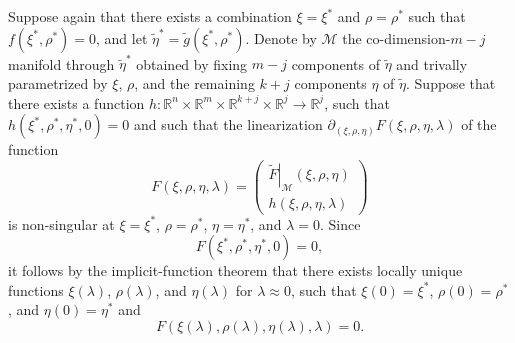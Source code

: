 \documentclass{article}
\begin{document}
Suppose again that there exists a combination $\xi =\xi ^{\ast }$ and $\rho
=\rho ^{\ast }$ such that $f\left( \xi ^{\ast },\rho ^{\ast }\right) =0$,
and let $\tilde{\eta}^{\ast }=\tilde{g}\left( \xi ^{\ast },\rho ^{\ast
}\right) $. Denote by $\mathcal{M}$ the co-dimension-$m-j$ manifold through $%
\tilde{\eta}^{\ast }$ obtained by fixing $m-j$ components of $\tilde{\eta}$
and trivally parametrized by $\xi $, $\rho $, and the remaining $k+j$
components $\eta $ of $\tilde{\eta}$. Suppose that there exists a function $%
h:\mathbb{R}^{n}\times \mathbb{R}^{m}\times \mathbb{R}^{k+j}\times \mathbb{R}%
^{j}\rightarrow \mathbb{R}^{j}$, such that $h\left( \xi ^{\ast },\rho ^{\ast
},\eta ^{\ast },0\right) =0$ and such that the linearization $\partial
_{\left( \xi ,\rho ,\eta \right) }F\left( \xi ,\rho ,\eta ,\lambda \right) $
of the function%
\begin{equation}
F\left( \xi ,\rho ,\eta ,\lambda \right) =\left( 
\begin{array}{c}
\left. \tilde{F}\right| _{\mathcal{M}}\left( \xi ,\rho ,\eta \right) \\ 
h\left( \xi ,\rho ,\eta ,\lambda \right)%
\end{array}%
\right)  \label{eq: Continuation}
\end{equation}%
is non-singular at $\xi =\xi ^{\ast }$, $\rho =\rho ^{\ast }$, $\eta =\eta
^{\ast }$, and $\lambda =0$. Since 
\[
F\left( \xi ^{\ast },\rho ^{\ast },\eta ^{\ast },0\right) =0, 
\]%
it follows by the implicit-function theorem that there exists locally unique
functions $\xi \left( \lambda \right) $, $\rho \left( \lambda \right) $, and 
$\eta \left( \lambda \right) $ for $\lambda \approx 0$, such that $\xi
\left( 0\right) =\xi ^{\ast }$, $\rho \left( 0\right) =\rho ^{\ast }$, and $%
\eta \left( 0\right) =\eta ^{\ast }$ and%
\[
F\left( \xi \left( \lambda \right) ,\rho \left( \lambda \right) ,\eta \left(
\lambda \right) ,\lambda \right) =0. 
\]
\end{document}
